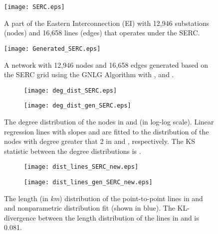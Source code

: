 \documentclass[10pt,journal]{IEEEtran}
\begin{document}
\begin{figure}[t]
\centering
\vspace*{-0.2cm}
\texttt{[image: SERC.eps]}
\vspace*{-0.2cm}
\caption{A part of the Eastern Interconnection (EI) with  12,946 substations (nodes) and 16,658 lines (edges) that operates under the SERC.}
\label{fig:SERC}
\vspace*{0.2cm}
\end{figure}

\begin{figure}[t]
\centering
\vspace*{-0.2cm}
\texttt{[image: Generated\_SERC.eps]}
\vspace*{-0.2cm}
\caption{A network with 12,946 nodes and 16,658 edges generated based on the SERC grid using the GNLG Algorithm with ,  and .}
\label{fig:Generated_SERC}
\vspace*{0.2cm}
\end{figure}





\begin{figure}[t]
\centering
\begin{subfigure}[b]{0.24\textwidth}
\vspace*{-0.2cm}
\texttt{[image: deg\_dist\_SERC.eps]}
\caption{}
\vspace*{0.2cm}
\end{subfigure}
\begin{subfigure}[b]{0.24\textwidth}
\vspace*{-0.2cm}
\texttt{[image: deg\_dist\_gen\_SERC.eps]}
\caption{}
\vspace*{0.2cm}
\end{subfigure}
\vspace{-0.6cm}
\caption{The degree distribution of the nodes in  and  (in
log-log scale). Linear regression lines with slopes  and  are fitted  to
the distribution of the nodes with degree greater that 2 in  and , respectively. The KS statistic between the degree distributions is .}
\label{fig:deg_dist_SERC}
\end{figure}

\begin{figure}[t]
\centering
\begin{subfigure}[b]{0.23\textwidth}
\vspace*{-0.2cm}
\texttt{[image: dist\_lines\_SERC\_new.eps]}
\caption{}
\vspace*{0.2cm}
\end{subfigure}
\begin{subfigure}[b]{0.23\textwidth}
\vspace*{-0.2cm}
\texttt{[image: dist\_lines\_gen\_SERC\_new.eps]}
\caption{}
\vspace*{0.2cm}
\end{subfigure}
\vspace{-0.2cm}
\caption{The  length (in \emph{km}) distribution of the point-to-point lines in   and  and nonparametric distribution fit (shown in blue). The KL-divergence between the length distribution of the lines in  and  is 0.081.}
\label{fig:dist_lines_SERC}
\end{figure}
\end{document}
